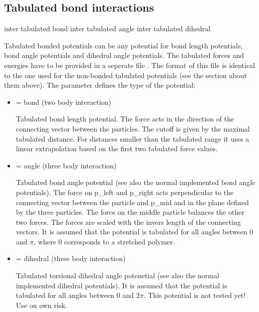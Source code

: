 \subsection{Tabulated bond interactions}

\begin{essyntax}
     inter 
    tabulated bond 
     inter 
    tabulated angle 
     inter 
    tabulated dihedral 
\end{essyntax}

Tabulated bonded potentials can be any potential for bond length
potentials, bond angle potentials and dihedral angle potentials. The
tabulated forces and energies have to be provided in a seperate file
. The format of this file is identical to the one used
for the non-bonded tabulated potentials (see the section about them
above). The parameter  defines the type of the potential:

\begin{itemize}
  \item {} = bond (two body interaction)

    Tabulated bond length potential. The force acts in the direction
    of the connecting vector between the particles. The cutoff is
    given by the maximal tabulated distance. For distances smaller
    than the tabulated range it uses a linear extrapolation based on
    the first two tabulated force values.

  \item {} = angle (three body interaction)

    Tabulated bond angle potential (see also the normal implemented
    bond angle potentials). The force on p_left and p_right acts
    perpendicular to the connecting vector between the particle and
    p_mid and in the plane defined by the three particles. The force
    on the middle particle balances the other two forces. The forces
    are scaled with the invers length of the connecting vectors. It is
    assumed that the potential is tabulated for all angles between 0
    and $ \pi $, where 0 corresponds to a stretched polymer.

  \item {} = dihedral (three body interaction)

    Tabulated torsional dihedral angle potenetial (see also the normal
    implemented dihedral potentials). It is assumed that the potential
    is tabulated for all angles between 0 and $ 2\pi $. This potential
    is not tested yet! Use on own risk.
\end{itemize}

